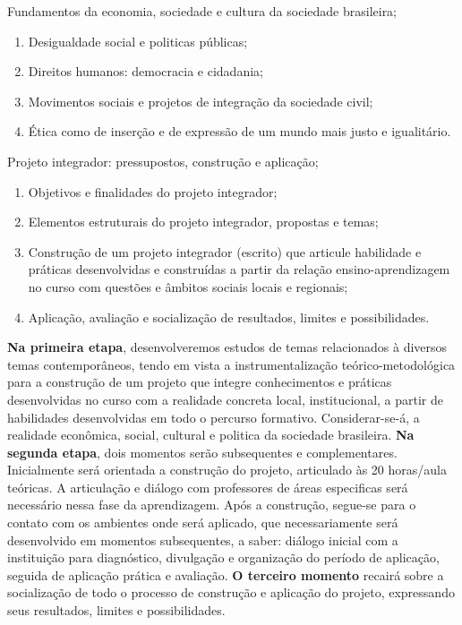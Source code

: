 \begin{pud}
	
	\programa
	\begin{description}[itemsep=0em]
		\item[UNIDADE I:] Fundamentos da economia, sociedade e cultura da sociedade brasileira; 
	         \begin{enumerate}[itemsep=0em, topsep=0em]
				\item Desigualdade social e politicas públicas;
                \item Direitos humanos: democracia e cidadania; %
                \item Movimentos sociais e projetos de integração da sociedade civil;
                \item Ética como de inserção e de expressão de um mundo mais justo e igualitário.
            \end{enumerate}
            
        \item[UNIDADE II:] Projeto integrador: pressupostos, construção e aplicação;
	         \begin{enumerate}[itemsep=0em, topsep=0em]
				\item Objetivos e finalidades do projeto integrador;
                \item Elementos estruturais do projeto integrador, propostas e temas;
                \item Construção de um projeto integrador (escrito) que articule habilidade e práticas desenvolvidas e construídas a partir da relação ensino-aprendizagem no curso com questões e âmbitos sociais locais e regionais;
                \item Aplicação, avaliação e socialização de resultados, limites e possibilidades.
            \end{enumerate}
            

	\end{description}
	
	\metodologia
	\textbf{Na primeira etapa}, desenvolveremos estudos de temas relacionados à diversos temas contemporâneos, tendo em vista a instrumentalização teórico-metodológica para a construção de um projeto que integre conhecimentos e práticas desenvolvidas no curso com a realidade concreta local, institucional, a partir de habilidades desenvolvidas em todo o percurso formativo. Considerar-se-á, a realidade econômica, social, cultural e politica da sociedade brasileira. \textbf{Na segunda etapa}, dois momentos serão subsequentes e complementares. Inicialmente será orientada a construção do projeto, articulado às 20 horas/aula teóricas. A articulação e diálogo com professores de áreas especificas será necessário nessa fase da aprendizagem.  Após a construção, segue-se para o contato com os ambientes onde será aplicado, que necessariamente será desenvolvido em momentos subsequentes, a saber: diálogo inicial com a instituição para diagnóstico, divulgação e organização do período de aplicação, seguida de aplicação prática e avaliação. \textbf{O terceiro momento} recairá sobre a socialização de todo o processo de construção e aplicação do projeto, expressando seus resultados, limites e possibilidades.
	

\end{pud}
